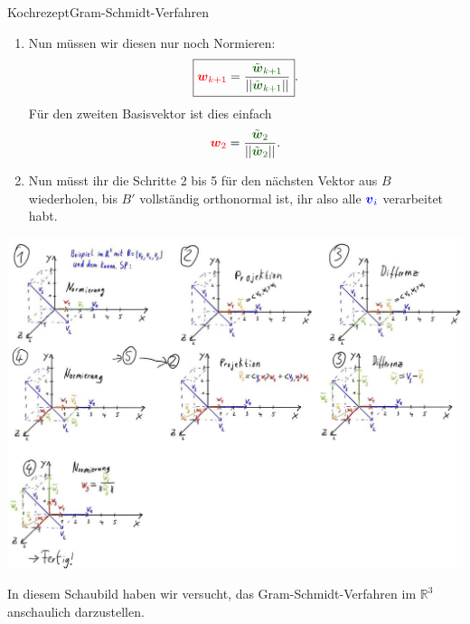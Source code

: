 \begin{Satz}{Kochrezept}{Gram-Schmidt-Verfahren}
\begin{enumerate}
\begin{equation}
	\end{equation}
	Für den zweiten Basisvektor ist dies einfach
	\begin{equation*}
	    \textcolor{mygreen}{\Tilde{\wvec}_2}=\textcolor{blue}{\vvec_2}-\textcolor{orange}{\Tilde{\vvec}_2}.
	\end{equation*}
	\item Nun müssen wir diesen nur noch Normieren:
	\begin{equation}
	    \boxed{\textcolor{red}{\wvec_{k+1}}=\frac{\textcolor{mygreen}{\Tilde{\wvec}_{k+1}}}{\Norm{\textcolor{mygreen}{\Tilde{\wvec}_{k+1}}}}}.
	\end{equation}
	Für den zweiten Basisvektor ist dies einfach
	\begin{equation*}
	\textcolor{red}{\wvec_{2}}=\frac{\textcolor{mygreen}{\Tilde{\wvec}_{2}}}{\Norm{\textcolor{mygreen}{\Tilde{\wvec}_{2}}}}.
	\end{equation*}
	\item Nun müsst ihr die Schritte 2 bis 5 für den nächsten Vektor aus $B$ wiederholen, bis $B'$ vollständig orthonormal ist, ihr also alle $\textcolor{blue}{{{\text{\boldmath${v}$}}}_i}$ verarbeitet habt.
\end{enumerate}
\end{Satz}
\begin{center}
    \includegraphics[width=\textwidth]{Dateien/03/03GramSchmidt.jpg}
\end{center}
In diesem Schaubild haben wir versucht, das Gram-Schmidt-Verfahren im $\mathbb{R}^3$ anschaulich darzustellen.

